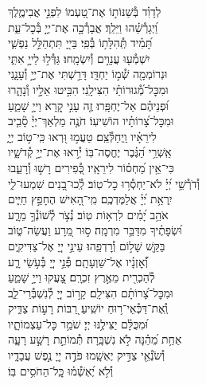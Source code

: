 \documentclass[twoside, openany, parskip=half, 11pt]{book}
\begin{document}
\begin{narrow}
לְדָוִ֗ד \hfill
בְּ֯שַׁנּוֹת֣וֹ אֶת־טַ֭עְמוֹ לִפְנֵ֣י אֲבִימֶ֑לֶךְ\\ וַ֝יְגָרְ֯שֵׁ֗הוּ וַיֵּלַֽךְ׃ \hfill
אֲבָרְ֯כָ֣ה אֶת־יְיָ֣ בְּ֯כׇל־עֵ֑ת \\ תָּ֝מִ֗יד תְּֽ֯הִלָּת֥וֹ בְּ֯פִֽי׃ \hfill
בַּייָ֭ תִּתְהַלֵּ֣ל נַפְשִׁ֑י\\ יִשְׁמְ֯ע֖וּ עֲנָוִ֣ים וְ֯יִשְׂמָֽחוּ׃ \hfill
גַּדְּ֯ל֣וּ לַייָ֣ אִתִּ֑י\\ וּנְרוֹמְמָ֖ה שְׁ֯מ֣וֹ יַחְדָּֽו׃ \hfill
דָּרַ֣שְׁתִּי אֶת־יְיָ֣ וְ֯עָנָ֑נִי\\ וּמִכׇּל־מְ֯֝גוּרוֹתַ֗י הִצִּילָֽנִי׃ \hfill
הִבִּ֣יטוּ אֵלָ֣יו וְ֯נָהָ֑רוּ\\ וּ֝פְנֵיהֶ֗ם אַל־יֶחְפָּֽרוּ׃ \hfill
זֶ֤ה עָנִ֣י קָ֭רָא וַייָ֣ שָׁמֵ֑עַ\\ וּמִכׇּל־צָ֝רוֹתָ֗יו הוֹשִׁיעֽוֹ׃ \hfill
חֹנֶ֤ה מַלְאַךְ־יְיָ֓ סָ֘בִ֤יב\\ לִירֵאָ֗יו וַֽיְחַלְּ֯צֵֽם׃ \hfill
טַעֲמ֣וּ וּ֭רְאוּ כִּֽי־ט֣וֹב יְיָ֑\\ אַֽשְׁרֵ֥י הַ֝גֶּ֗בֶר יֶחֱסֶה־בּֽוֹ׃ \hfill
יְ֯ר֣אוּ אֶת־יְיָ֣ קְ֯דֹשָׁ֑יו\\ כִּי־אֵ֥ין מַ֝חְס֗וֹר לִירֵאָֽיו׃ \hfill
כְּ֭֯פִירִים רָשׁ֣וּ וְ֯רָעֵ֑בוּ\\ וְ֯דֹרְ֯שֵׁ֥י יְ֝יָ֗ לֹא־יַחְסְ֯ר֥וּ כׇל־טֽוֹב׃ \hfill
לְֽ֯כוּ־בָ֭נִים שִׁמְעוּ־לִ֑י\\ יִֽרְאַ֥ת יְ֝יָ֗ אֲלַמֶּדְכֶֽם׃ \hfill
מִֽי־הָ֭אִישׁ הֶחָפֵ֣ץ חַיִּ֑ים\\ אֹהֵ֥ב יָ֝מִ֗ים לִרְא֥וֹת טֽוֹב׃ \hfill
נְ֯צֹ֣ר לְ֯שׁוֹנְ֯ךָ֣ מֵרָ֑ע\\ וּ֝שְׂפָתֶ֗יךָ מִדַּבֵּ֥ר מִרְמָֽה׃ \hfill
ס֣וּר מֵ֭רָע וַעֲשֵׂה־ט֑וֹב\\ בַּקֵּ֖שׁ שָׁל֣וֹם וְ֯רׇדְפֵֽהוּ׃ \hfill
עֵינֵ֣י יְיָ֭ אֶל־צַדִּיקִ֑ים\\ וְ֯֝אׇזְנָ֗יו אֶל־שַׁוְעָתָֽם׃ \hfill
פְּ֯נֵ֣י יְיָ֭ בְּ֯עֹ֣שֵׂי רָ֑ע\\ לְ֯הַכְרִ֖ית מֵאֶ֣רֶץ זִכְרָֽם׃ \hfill
צָ֭עֲקוּ וַייָ֣ שָׁמֵ֑עַ\\ וּמִכׇּל־צָ֝רוֹתָ֗ם הִצִּילָֽם׃ \hfill
קָר֣וֹב יְיָ֭ לְ֯נִשְׁבְּ֯רֵי־לֵ֑ב\\ וְֽ֯אֶת־דַּכְּ֯אֵי־ר֥וּחַ יוֹשִֽׁיעַ׃ \hfill
רַ֭בּוֹת רָע֣וֹת צַדִּ֑יק\\ וּ֝מִכֻּלָּ֗ם יַצִּילֶ֥נּוּ יְיָ׃ \hfill
שֹׁמֵ֥ר כׇּל־עַצְמוֹתָ֑יו\\ אַחַ֥ת מֵ֝הֵ֗נָּה לֹ֣א נִשְׁבָּֽרָה׃ \hfill
תְּ֯מוֹתֵ֣ת רָשָׁ֣ע רָעָ֑ה\\ וְ֯שֹׂנְ֯אֵ֖י צַדִּ֣יק יֶאְשָֽׁמוּ׃ \hfill
פֹּדֶ֣ה יְיָ֭ נֶ֣פֶשׁ עֲבָדָ֑יו\\ וְ֯לֹ֥א יֶ֝אְשְׁ֯מ֗וּ \hfill כׇּֽל־הַחֹסִ֥ים בּֽוֹ׃ \\




\end{narrow}
\end{document}
